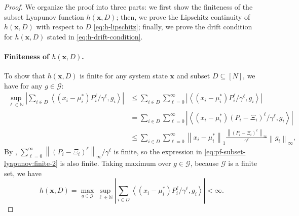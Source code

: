 \documentclass{article}
\theoremstyle{plain}
\theoremstyle{remark}
\newcommand{\norm}[1]{\left\lVert#1\right\rVert}
\newcommand{\abs}[1]{\left\lvert#1\right\rvert}
\newcommand{\mx}{\bm{x}}
\newcommand{\sumell}{\sum_{\ell=0}^\infty}
\newcommand{\supell}{\sup_{\ell\in\mathbb{N}}}
\newcommand{\innerproduct}[2]{\left\langle #1, #2 \right\rangle}
\begin{document}
\begin{proof}
We organize the proof into three parts: we first show the finiteness of the subset Lyapunov function $h(\mx, D)$; then, we prove the Lipschitz continuity of $h(\mx, D)$ with respect to $D$ \eqref{eq:h-lipschitz}; finally, we prove the drift condition for $h(\mx, D)$ stated in \eqref{eq:h-drift-condition}. 

\paragraph{Finiteness of $h(\mx, D)$.}
To show that $h(\mx,D)$ is finite for any system state $\mx$ and subset $D\subseteq [N]$, we have for any $g\in \mathcal{G}$: 
\begin{align}
    \nonumber
    \supell \abs{\sum_{i\in D} \innerproduct{(x_i-\mu_i^*) P_i^{\ell} / \gamma^{\ell}}{g_i}}
    &\leq \sum_{i\in D} \sumell \abs{\innerproduct{(x_i-\mu_i^*) P_i^{\ell} / \gamma^{\ell}}{g_i}}\\
    \label{eq:pf-subset-lyapunov:finite-1}
    &= \sum_{i\in D}\sumell \abs{\innerproduct{(x_i-\mu_i^*) (P_i-\Xi_i)^{\ell} / \gamma^{\ell}}{g_i}} \\
    \label{eq:pf-subset-lyapunov:finite-2}
    &\leq \sum_{i\in D} \sumell \norm{x_i-\mu_i^*}_1\frac{\norm{(P_i-\Xi_i)^{\ell}}_\infty}{\gamma^{\ell}}\norm{g_i}_\infty,
\end{align}
By , $\sumell \norm{(P_i-\Xi_i)^{\ell}}_\infty / \gamma^{\ell}$ is finite, so the expression in \eqref{eq:pf-subset-lyapunov:finite-2} is also finite. Taking maximum over $g\in \mathcal{G}$, because $\mathcal{G}$ is a finite set, we have 
\[
    h(\mx, D) = \max_{g\in \mathcal{G}} \supell \abs{\sum_{i\in D} \innerproduct{(x_i-\mu_i^*) P_i^{\ell} / \gamma^{\ell}}{g_i}} < \infty.
\]


\end{proof}
\end{document}

